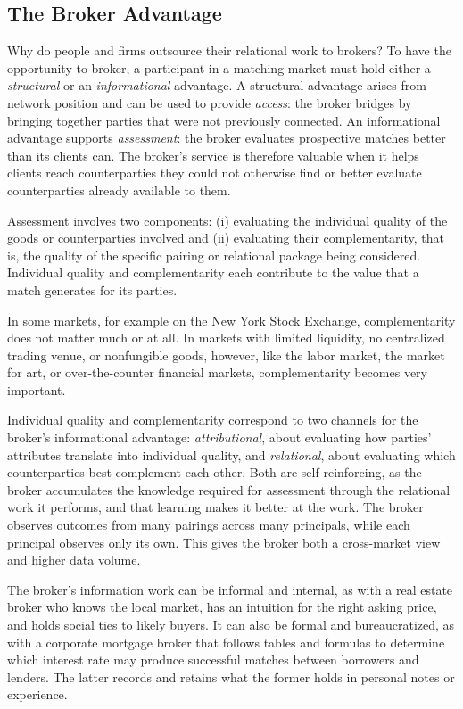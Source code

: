 \documentclass[
]{article}
\begin{document}
\subsection{The Broker Advantage}
\label{sec:broker-advantage}

Why do people and firms outsource their relational work to brokers? To have the opportunity to broker, a participant in a matching market must hold either a \emph{structural} or an \emph{informational} advantage. A structural advantage arises from network position and can be used to provide \emph{access}: the broker bridges by bringing together parties that were not previously connected. An informational advantage supports \emph{assessment}: the broker evaluates prospective matches better than its clients can. The broker's service is therefore valuable when it helps clients reach counterparties they could not otherwise find or better evaluate counterparties already available to them.

Assessment involves two components: (i) evaluating the individual quality of the goods or counterparties involved and (ii) evaluating their complementarity, that is, the quality of the specific pairing or relational package being considered. Individual quality and complementarity each contribute to the value that a match generates for its parties.

In some markets, for example on the New York Stock Exchange, complementarity does not matter much or at all. In markets with limited liquidity, no centralized trading venue, or nonfungible goods, however, like the labor market, the market for art, or over-the-counter financial markets, complementarity becomes very important.

Individual quality and complementarity correspond to two channels for the broker's informational advantage: \emph{attributional}, about evaluating how parties' attributes translate into individual quality, and \emph{relational}, about evaluating which counterparties best complement each other. Both are self-reinforcing, as the broker accumulates the knowledge required for assessment through the relational work it performs, and that learning makes it better at the work. The broker observes outcomes from many pairings across many principals, while each principal observes only its own. This gives the broker both a cross-market view and higher data volume.

The broker's information work can be informal and internal, as with a real estate broker who knows the local market, has an intuition for the right asking price, and holds social ties to likely buyers. It can also be formal and bureaucratized, as with a corporate mortgage broker that follows tables and formulas to determine which interest rate may produce successful matches between borrowers and lenders. The latter records and retains what the former holds in personal notes or experience.
\end{document}
